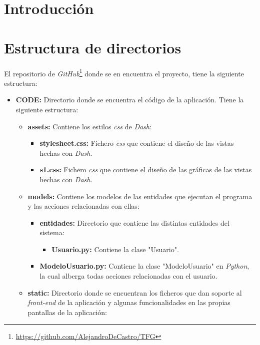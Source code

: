 
\section{Introducción}

\section{Estructura de directorios}

El repositorio de \textit{GitHub}\footnote{\url{https://github.com/AlejandroDeCastro/TFG}} donde se en encuentra el proyecto, tiene la siguiente estructura:
\begin{itemize}
    \item \textbf{CODE:} Directorio donde se encuentra el código de la aplicación. Tiene la siguiente estructura:
    \begin{itemize}
        \item \textbf{assets:} Contiene los estilos \textit{css} de \textit{Dash}:
        \begin{itemize}
            \item \textbf{stylesheet.css:} Fichero \textit{css} que contiene el diseño de las vistas hechas con \textit{Dash}.
            \item \textbf{s1.css:} Fichero \textit{css} que contiene el diseño de las gráficas de las vistas hechas con \textit{Dash}.
        \end{itemize}
        \item \textbf{models:} Contiene los modelos de las entidades que ejecutan el programa y las acciones relacionadas con ellas:
        \begin{itemize}
            \item \textbf{entidades:} Directorio que contiene las distintas entidades del sistema:
            \begin{itemize}
                \item \textbf{Usuario.py:} Contiene la clase "Usuario". 
            \end{itemize}
            \item \textbf{ModeloUsuario.py:} Contiene la clase "ModeloUsuario" en \textit{Python}, la cual alberga todas acciones relacionadas con el usuario.
        \end{itemize}
        \item \textbf{static:} Directorio donde se encuentran los ficheros que dan soporte al \textit{front-end} de la aplicación y algunas funcionalidades en las propias pantallas de la aplicación:

\end{itemize}
\end{itemize}
